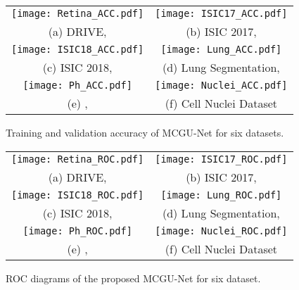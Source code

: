 \documentclass[journal]{IEEEtran}
\begin{document}
\begin{figure}[ht]
	\centering
	\begin{tabular}{cc}
\texttt{[image: Retina\_ACC.pdf]}&
		\texttt{[image: ISIC17\_ACC.pdf]} \\
		(a) DRIVE, & (b) ISIC 2017, \\
		\texttt{[image: ISIC18\_ACC.pdf]} &
		\texttt{[image: Lung\_ACC.pdf]} \\
		(c) ISIC 2018,&  (d) Lung Segmentation,  \\
		\texttt{[image: Ph\_ACC.pdf]} &
		\texttt{[image: Nuclei\_ACC.pdf]}  \\
		 (e) ,  & (f) Cell Nuclei Dataset\\
	\end{tabular}
	\caption{Training and validation accuracy of MCGU-Net for six datasets.}
	\vspace*{-\baselineskip}
	\label{fig:converge}
\end{figure}



















\begin{figure}[ht]
	\centering
	\begin{tabular}{cc}
\texttt{[image: Retina\_ROC.pdf]}&
		\texttt{[image: ISIC17\_ROC.pdf]}\\
		(a) DRIVE, & (b) ISIC 2017, \\
		\texttt{[image: ISIC18\_ROC.pdf]} &
		\texttt{[image: Lung\_ROC.pdf]}\\
		(c) ISIC 2018, & (d) Lung Segmentation,\\
		\texttt{[image: Ph\_ROC.pdf]}&
		\texttt{[image: Nuclei\_ROC.pdf]} \\
		 (e) , & (f) Cell Nuclei Dataset\\
	\end{tabular}
	\caption{ROC diagrams of the proposed MCGU-Net for six dataset.}
	\vspace*{-\baselineskip}
	\label{fig:ROCs}
\end{figure}
\end{document}
